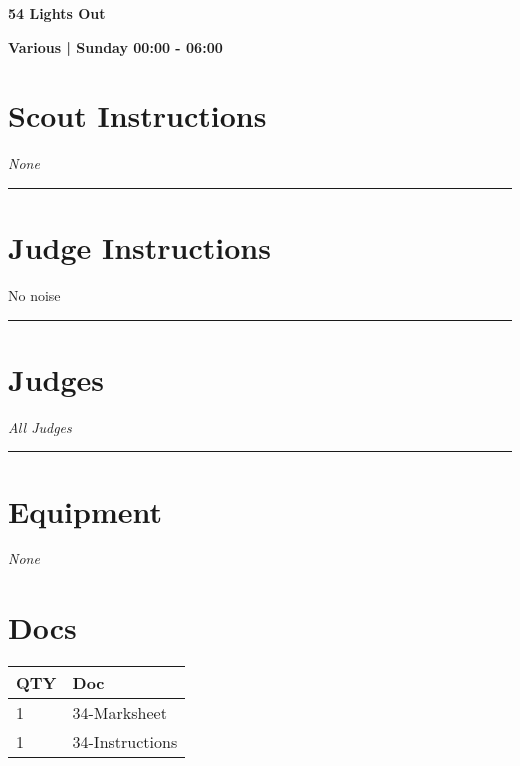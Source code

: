 \documentclass[10pt]{article}
\newcommand{\newtitle}[1]{\begin{center}{\Huge\bfseries #1 }\\ \vspace{5mm}\end{center}}
\newcommand{\newsubtitle}[1]{\begin{center}{\color{grey}\Large\bfseries #1 }\\ \vspace{5mm}\end{center}}
\begin{document}
	\vspace{1cm}


	\clearpage
		\newtitle{54 Lights Out }
	\newsubtitle{Various | Sunday 00:00 - 06:00}
		\setcounter{section}{53}
	\section*{Scout Instructions}
		\textit{None}
	
	\vspace{0.5cm}
	\hrule
	\vspace{0.5cm}

		\section*{Judge Instructions}
		No noise
\vspace{0.5cm}
	\hrule
	\vspace{0.5cm}
		\section*{\faUsers \: Judges}

					\textit{All Judges}
			\vspace{0.5cm}
	\hrule
	\vspace{0.5cm}

	\begin{multicols}{2}

		\section*{\faWrench \: Equipment}

				\textit{None}
		
		\vfill\null
		\columnbreak

			\section*{\faFile \: Docs}
		 	\begin{center}
			\begin{tabular}{p{2cm}p{4cm}}

			\textbf{QTY} & \textbf{Doc} \\\toprule
										1&34-Marksheet\\\midrule
										1&34-Instructions\\\midrule
							\end{tabular}
			\end{center}
	

		\vfill\null

		\end{multicols}
\end{document}

